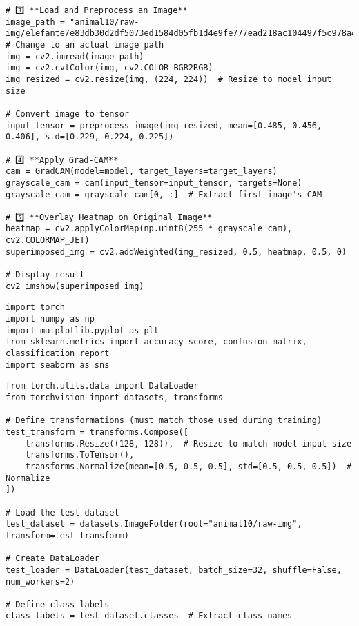\documentclass{article}
\begin{document}
\begin{verbatim}
# 3️⃣ **Load and Preprocess an Image**
image_path = "animal10/raw-img/elefante/e83db30d2df5073ed1584d05fb1d4e9fe777ead218ac104497f5c978a4efbcb0_640.jpg"  # Change to an actual image path
img = cv2.imread(image_path)
img = cv2.cvtColor(img, cv2.COLOR_BGR2RGB)
img_resized = cv2.resize(img, (224, 224))  # Resize to model input size

# Convert image to tensor
input_tensor = preprocess_image(img_resized, mean=[0.485, 0.456, 0.406], std=[0.229, 0.224, 0.225])

# 4️⃣ **Apply Grad-CAM**
cam = GradCAM(model=model, target_layers=target_layers)
grayscale_cam = cam(input_tensor=input_tensor, targets=None)
grayscale_cam = grayscale_cam[0, :]  # Extract first image's CAM

# 5️⃣ **Overlay Heatmap on Original Image**
heatmap = cv2.applyColorMap(np.uint8(255 * grayscale_cam), cv2.COLORMAP_JET)
superimposed_img = cv2.addWeighted(img_resized, 0.5, heatmap, 0.5, 0)

# Display result
cv2_imshow(superimposed_img)
\end{verbatim}

\begin{verbatim}
import torch
import numpy as np
import matplotlib.pyplot as plt
from sklearn.metrics import accuracy_score, confusion_matrix, classification_report
import seaborn as sns

\end{verbatim}

\begin{verbatim}
from torch.utils.data import DataLoader
from torchvision import datasets, transforms

# Define transformations (must match those used during training)
test_transform = transforms.Compose([
    transforms.Resize((128, 128)),  # Resize to match model input size
    transforms.ToTensor(),
    transforms.Normalize(mean=[0.5, 0.5, 0.5], std=[0.5, 0.5, 0.5])  # Normalize
])

# Load the test dataset
test_dataset = datasets.ImageFolder(root="animal10/raw-img", transform=test_transform)

# Create DataLoader
test_loader = DataLoader(test_dataset, batch_size=32, shuffle=False, num_workers=2)

# Define class labels
class_labels = test_dataset.classes  # Extract class names

\end{verbatim}
\end{document}

